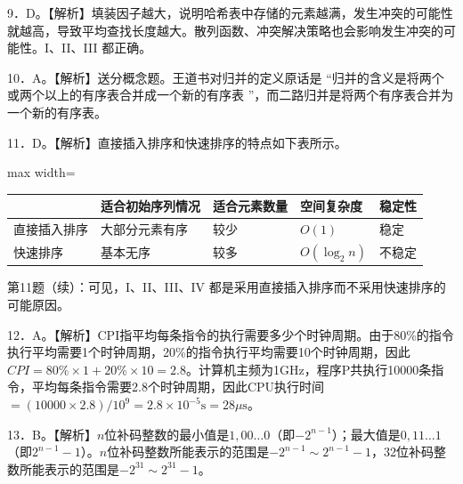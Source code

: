 \documentclass[UTF8,11pt]{ctexart}
\begin{document}
9．D。【解析】填装因子越大，说明哈希表中存储的元素越满，发生冲突的可能性就越高，导致平均查找长度越大。散列函数、冲突解决策略也会影响发生冲突的可能性。I、II、III 都正确。


10．A。【解析】送分概念题。王道书对归并的定义原话是 “归并的含义是将两个或两个以上的有序表合并成一个新的有序表 ”，而二路归并是将两个有序表合并为一个新的有序表。


11．D。【解析】直接插入排序和快速排序的特点如下表所示。


\begin{center}\begin{adjustbox}{max width=\linewidth}\begin{tabular}{|>{\raggedright\arraybackslash}p{\dimexpr(\linewidth-10\tabcolsep-6\arrayrulewidth)/5\relax}|>{\raggedright\arraybackslash}p{\dimexpr(\linewidth-10\tabcolsep-6\arrayrulewidth)/5\relax}|>{\raggedright\arraybackslash}p{\dimexpr(\linewidth-10\tabcolsep-6\arrayrulewidth)/5\relax}|>{\raggedright\arraybackslash}p{\dimexpr(\linewidth-10\tabcolsep-6\arrayrulewidth)/5\relax}|>{\raggedright\arraybackslash}p{\dimexpr(\linewidth-10\tabcolsep-6\arrayrulewidth)/5\relax}|}\hline
 & 适合初始序列情况 & 适合元素数量 & 空间复杂度 & 稳定性\\\hline
直接插入排序 & 大部分元素有序 & 较少 & \(\displaystyle O(1)\) & 稳定\\\hline
快速排序 & 基本无序 & 较多 & \(\displaystyle O(\log_2 n)\) & 不稳定\\\hline\end{tabular}\end{adjustbox}\end{center}

第11题（续）：可见，I、II、III、IV 都是采用直接插入排序而不采用快速排序的可能原因。


12．A。【解析】CPI指平均每条指令的执行需要多少个时钟周期。由于80\%的指令执行平均需要1个时钟周期，20\%的指令执行平均需要10个时钟周期，因此\(\displaystyle CPI=80\%\times1+20\%\times10=2.8\)。计算机主频为1GHz，程序P共执行10000条指令，平均每条指令需要2.8个时钟周期，因此CPU执行时间\(\displaystyle =(10000\times2.8)/10^9=2.8\times10^{-5}\mathrm{s}=28\mu\mathrm{s}\)。


13．B。【解析】\(\displaystyle n\)位补码整数的最小值是\(\displaystyle 1,\allowbreak 00\ldots0\)（即\(\displaystyle -2^{n-1}\)）；最大值是\(\displaystyle 0,\allowbreak 11\ldots1\)（即\(\displaystyle 2^{n-1}-1\)）。\(\displaystyle n\)位补码整数所能表示的范围是\(\displaystyle -2^{n-1}\sim2^{n-1}-1\)，32位补码整数所能表示的范围是\(\displaystyle -2^{31}\sim2^{31}-1\)。
\end{document}
